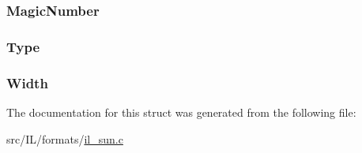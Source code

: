 \hypertarget{struct_s_u_n_h_e_a_d_a6067c2377443ff227cbcd5d99a607e65}{
\subsubsection[{Magic\-Number}]{ Magic\-Number}}\label{struct_s_u_n_h_e_a_d_a6067c2377443ff227cbcd5d99a607e65}
\hypertarget{struct_s_u_n_h_e_a_d_a0dfd5e410737b8035ece841196919127}{
\subsubsection[{Type}]{ Type}}\label{struct_s_u_n_h_e_a_d_a0dfd5e410737b8035ece841196919127}
\hypertarget{struct_s_u_n_h_e_a_d_a4146e7b2b0b4097e0e335f9b348392bf}{
\subsubsection[{Width}]{ Width}}\label{struct_s_u_n_h_e_a_d_a4146e7b2b0b4097e0e335f9b348392bf}


The documentation for this struct was generated from the following file\-:\begin{DoxyCompactItemize}
\item 
src/\-I\-L/formats/\hyperlink{il__sun_8c}{il\-\_\-sun.\-c}\end{DoxyCompactItemize}
